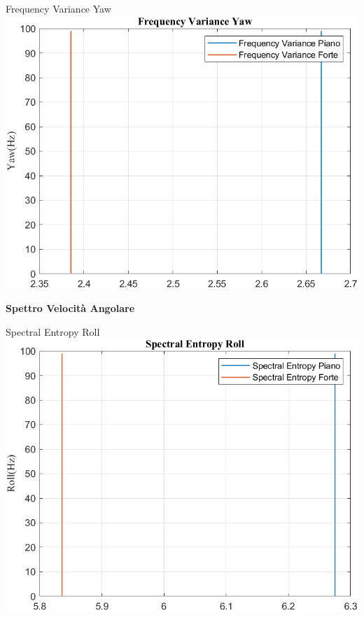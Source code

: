 	\begin{frame}{{Frequency Variance Yaw}}
		\centering\includegraphics[height=.8\textheight]{figure/VAng/Trasformata/Frequency VarianceYaw}
	\end{frame}
	
	\begin{frame}
		\color{blue}\centering\huge{\textbf{Spettro Velocità Angolare}}
	\end{frame}
	
	
	
	\begin{frame}{{Spectral Entropy Roll}}
		\centering\includegraphics[height=.8\textheight]{figure/VAng/Trasformata/Spectral EntropyRoll}
	\end{frame}
	
